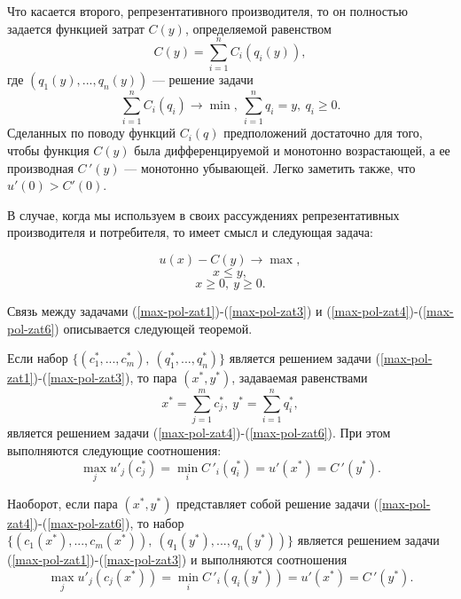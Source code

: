     Что касается второго, репрезентативного производителя,
    то он полностью задается функцией затрат $C(y)$,
    определяемой равенством
    \[C(y)=\sum_{i=1}^{n}C_{i}(q_{i}(y)),\]
    где $(q_{1}(y),...,q_{n}(y))$ --- решение задачи
    \[\sum_{i=1}^{n}C_{i}(q_{i})\rightarrow\min, \ \sum_{i=1}^{n}q_{i}=y,
    \ q_{i}\geqslant0.\]
    Сделанных по поводу
    функций $C_{i}(q)$ предположений достаточно
    для того, чтобы функция $C(y)$ была дифференцируемой и монотонно возрастающей,
    а ее производная $C\,'(y)$ --- монотонно убывающей.
    Легко заметить также, что $u'(0)>C'(0)$.

    В случае, когда мы используем в своих рассуждениях
    репрезентативных производителя и потребителя, то имеет смысл и
    следующая задача:

\begin{equation}
 \label{max-pol-zat4}
    u(x)-C(y)\rightarrow\max,
\end{equation}
\begin{equation}
 \label{max-pol-zat5}
    x\leqslant y,
\end{equation}
\begin{equation}
 \label{max-pol-zat6}
    x\geqslant0, \ y\geqslant0.
\end{equation}

    Связь между задачами (\ref{max-pol-zat1})-(\ref{max-pol-zat3}) и
    (\ref{max-pol-zat4})-(\ref{max-pol-zat6}) описывается следующей
    теоремой.

\begin{teo}
    Если набор $\{(c_{1}^{*},...,c_{m}^{*}), \ (q_{1}^{*},...,q_{n}^{*})\}$
    является решением задачи
    (\ref{max-pol-zat1})-(\ref{max-pol-zat3}),
    то пара $(x^{*},y^{*})$, задаваемая равенствами
    \[x^{*}=\sum_{j=1}^{m}c_{j}^{*}, \ y^{*}=\sum_{i=1}^{n}q_{i}^{*},\]
    является решением задачи
    (\ref{max-pol-zat4})-(\ref{max-pol-zat6}). При этом выполняются
    следующие соотношения:
    \[\max_{j}u'_{j}(c_{j}^{*})=\min_{i}C\,'_{i}(q_{i}^{*})=u'(x^{*})=C\,'(y^{*}).\]

    Наоборот, если пара $(x^{*},y^{*})$ представляет собой решение
    задачи (\ref{max-pol-zat4})-(\ref{max-pol-zat6}), то набор
    $\{(c_{1}(x^{*}),...,c_{m}(x^{*})), \ (q_{1}(y^{*}),...,q_{n}(y^{*}))\}$
    является решением задачи
    (\ref{max-pol-zat1})-(\ref{max-pol-zat3}) и выполняются соотношения
    \[\max_{j}u'_{j}(c_{j}(x^{*}))=\min_{i}C\,'_{i}(q_{i}(y^{*}))=u'(x^{*})=C\,'(y^{*}).\]

\end{teo}

